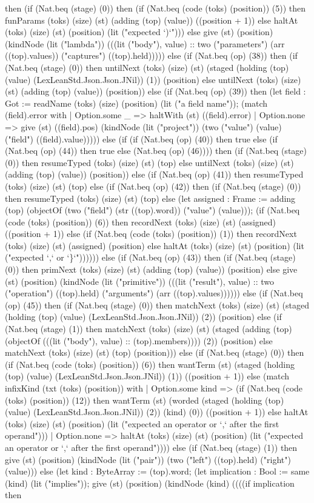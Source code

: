 \documentclass[11pt]{article}
\begin{document}
then (if (Nat.beq (stage) (0)) then (if (Nat.beq (code (toks) (position)) (5)) then funParams (toks) (size) (st) (adding (top) (value)) ((position + 1)) else haltAt (toks) (size) (st) (position) (lit ("expected `)`"))) else give (st) (position) (kindNode (lit ("lambda")) (((lit ("body"), value) :: two ("parameters") (arr ((top).values)) ("captures") ((top).held))))) else (if (Nat.beq (op) (38)) then (if (Nat.beq (stage) (0)) then untilNext (toks) (size) (st) (staged (holding (top) (value) (LexLeanStd.Json.Json.JNil)) (1)) (position) else untilNext (toks) (size) (st) (adding (top) (value)) (position)) else (if (Nat.beq (op) (39)) then (let field : Got := readName (toks) (size) (position) (lit ("a field name")); (match (field).error with | Option.some \_ => haltWith (st) ((field).error) | Option.none => give (st) ((field).pos) (kindNode (lit ("project")) (two ("value") (value) ("field") ((field).value))))) else (if (if (Nat.beq (op) (40)) then true else (if (Nat.beq (op) (44)) then true else (Nat.beq (op) (46)))) then (if (Nat.beq (stage) (0)) then resumeTyped (toks) (size) (st) (top) else untilNext (toks) (size) (st) (adding (top) (value)) (position)) else (if (Nat.beq (op) (41)) then resumeTyped (toks) (size) (st) (top) else (if (Nat.beq (op) (42)) then (if (Nat.beq (stage) (0)) then resumeTyped (toks) (size) (st) (top) else (let assigned : Frame := adding (top) (objectOf (two ("field") (str ((top).word)) ("value") (value))); (if (Nat.beq (code (toks) (position)) (6)) then recordNext (toks) (size) (st) (assigned) ((position + 1)) else (if (Nat.beq (code (toks) (position)) (1)) then recordNext (toks) (size) (st) (assigned) (position) else haltAt (toks) (size) (st) (position) (lit ("expected `,` or `\}`")))))) else (if (Nat.beq (op) (43)) then (if (Nat.beq (stage) (0)) then primNext (toks) (size) (st) (adding (top) (value)) (position) else give (st) (position) (kindNode (lit ("primitive")) (((lit ("result"), value) :: two ("operation") ((top).held) ("arguments") (arr ((top).values)))))) else (if (Nat.beq (op) (45)) then (if (Nat.beq (stage) (0)) then matchNext (toks) (size) (st) (staged (holding (top) (value) (LexLeanStd.Json.Json.JNil)) (2)) (position) else (if (Nat.beq (stage) (1)) then matchNext (toks) (size) (st) (staged (adding (top) (objectOf (((lit ("body"), value) :: (top).members)))) (2)) (position) else matchNext (toks) (size) (st) (top) (position))) else (if (Nat.beq (stage) (0)) then (if (Nat.beq (code (toks) (position)) (6)) then wantTerm (st) (staged (holding (top) (value) (LexLeanStd.Json.Json.JNil)) (1)) ((position + 1)) else (match infixKind (txt (toks) (position)) with | Option.some kind => (if (Nat.beq (code (toks) (position)) (12)) then wantTerm (st) (worded (staged (holding (top) (value) (LexLeanStd.Json.Json.JNil)) (2)) (kind) (0)) ((position + 1)) else haltAt (toks) (size) (st) (position) (lit ("expected an operator or `,` after the first operand"))) | Option.none => haltAt (toks) (size) (st) (position) (lit ("expected an operator or `,` after the first operand")))) else (if (Nat.beq (stage) (1)) then give (st) (position) (kindNode (lit ("pair")) (two ("left") ((top).held) ("right") (value))) else (let kind : ByteArray := (top).word; (let implication : Bool := same (kind) (lit ("implies")); give (st) (position) (kindNode (kind) ((((if implication then 
\end{document}
